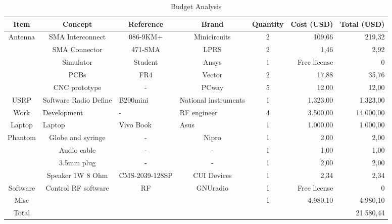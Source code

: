 \documentclass[lettersize,journal]{IEEEtran}
\begin{document}
\begin{table}[]
\centering
\caption{Budget Analysis}
\label{tab:budget}
\begin{tabular}{|c|c|c|c|c|r|r|}
\hline
Item &
  Concept &
  Reference &
  Brand &
  Quantity &
  \multicolumn{1}{c|}{Cost (USD)} &
  \multicolumn{1}{c|}{Total (USD)} \\ \hline
\multirow{5}{*}{Antenna} &
  SMA   Interconnect &
  086-9KM+ &
  Minicircuits &
  2 &
  109,66 &
  219,32 \\ \cline{2-7} 
                         & SMA   Connector     & 471-SMA        & LPRS        & 2 & 1,46           & 2,92      \\ \cline{2-7} 
                         & Simulator           & Student        & Ansys       & 1 & Free   license & 0         \\ \cline{2-7} 
                         & PCBs                & FR4            & Vector      & 2 & 17,88          & 35,76     \\ \cline{2-7} 
                         & CNC   prototype     & -              & PCway       & 5 & 12,00          & 12,00     \\ \hline
USRP &
  \multicolumn{1}{l|}{Software   Radio Define} &
  \multicolumn{1}{l|}{B200mini} &
  \multicolumn{1}{l|}{National instruments} &
  1 &
  1.323,00 &
  1.323,00 \\ \hline
Work &
  \multicolumn{1}{l|}{Development} &
  \multicolumn{1}{l|}{-} &
  \multicolumn{1}{l|}{RF engineer} &
  4 &
  3.500,00 &
  14.000,00 \\ \hline
Laptop &
  \multicolumn{1}{l|}{Laptop} &
  \multicolumn{1}{l|}{Vivo Book} &
  \multicolumn{1}{l|}{Asus} &
  1 &
  1.000,00 &
  1.000,00 \\ \hline
\multirow{4}{*}{Phantom} & Globe   and syringe & -              & Nipro       & 1 & 2,00           & 2,00      \\ \cline{2-7} 
                         & Audio   cable       & -              & -           & 1 & 1,00           & 1,00      \\ \cline{2-7} 
                         & 3.5mm   plug        & -              & -           & 1 & 2,00           & 2,00      \\ \cline{2-7} 
                         & Speaker   1W 8 Ohm  & CMS-2039-128SP & CUI Devices & 1 & 2,34           & 2,34      \\ \hline
Software                 & Control RF software & RF             & GNUradio    & 1 & Free license   & 0         \\ \hline
Misc                     &                     &                &             & 1 & 4.980,10       & 4.980,10  \\ \hline
Total                    &                     &                &             &   &                & 21.580,44 \\ \hline
\end{tabular}
\end{table}
\end{document}
